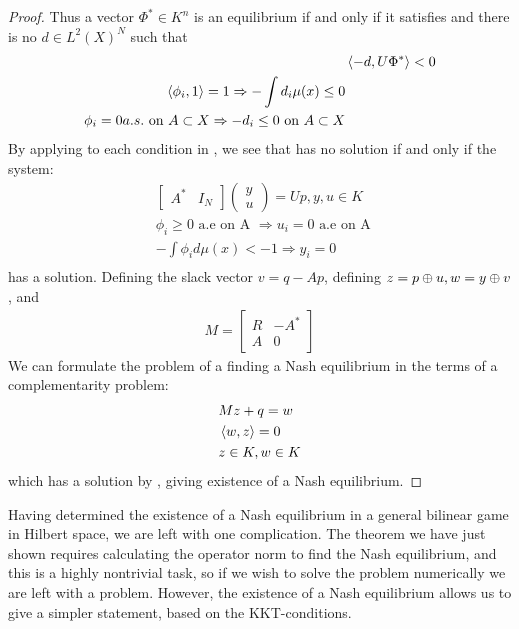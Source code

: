 \begin{proof}
    Thus a vector $\Phi^* \in K^n$ is an equilibrium if and only if it satisfies  and there is no $d \in L^2(X)^N$ such that
    \begin{align*}
      &\ip{-d}{U \Phi^*} < 0 \\
      \ip{\phi_i}{1} = 1 \Rightarrow -\int d_i \mu(x) \leq 0 \\
      \phi_i = 0 a.s. \text{ on } A\subset X \Rightarrow -d_i \leq 0  \text{ on } A\subset X
    \end{align*}
    By applying  to each condition in , we see that  has no solution if and only if the system:
    \begin{align*}
      &\begin{bmatrix} A^* & I_{N} \end{bmatrix}\begin{pmatrix} y \\ u \end{pmatrix}  = Up, y,u \in K \\
			&	\phi_i \geq 0 \text{ a.e on A } \Rightarrow u_i = 0 \text{ a.e on A } \\
			&	-\int \phi_i d\mu(x) < -1 \Rightarrow y_i=0 \\
    \end{align*}
    has a solution.
		Defining the slack vector $v = q - Ap$, defining $z=p\oplus u, w = y\oplus v$, and
		\begin{align}
			M =\begin{bmatrix}
				R & -A^* \\
				A & 0
			\end{bmatrix}
		\end{align}
    We can formulate the problem of a finding a Nash equilibrium in the terms of a complementarity problem:
    \begin{align*}
      &Mz+q=w \\
      &\left \langle w,z \right \rangle = 0 \\
      &z \in K, w\in K
    \end{align*}
    which has a solution by , giving existence of a Nash equilibrium.
\end{proof}
Having determined the existence of a Nash equilibrium in a general bilinear game in Hilbert space, we are left with one complication. The theorem we have just shown requires calculating the operator norm to find the Nash equilibrium, and this is a highly nontrivial task, so if we wish to solve the problem numerically we are left with a problem. However, the existence of a Nash equilibrium allows us to give a simpler statement, based on the KKT-conditions.
